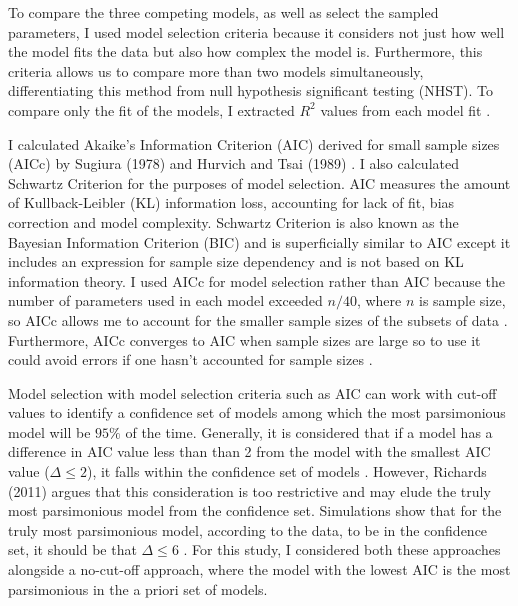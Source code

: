 \documentclass[11pt]{article}
\begin{document}
    To compare the three competing models, as well as select the sampled parameters, I used model selection criteria because it considers not just how well the model fits the data but also how complex the model is. Furthermore, this criteria allows us to compare more than two models simultaneously, differentiating this method from null hypothesis significant testing (NHST). To compare only the fit of the models, I extracted $R^2$ values from each model fit \cite{JohnsonOmland2004}.
    
    I calculated Akaike’s Information Criterion (AIC) derived for small sample sizes (AICc) by Sugiura (1978) and Hurvich and Tsai (1989) \cite{Burnham2011}. I also calculated Schwartz Criterion for the purposes of model selection. AIC measures the amount of Kullback-Leibler (KL) information loss, accounting for lack of fit, bias correction and model complexity. Schwartz Criterion is also known as the Bayesian Information Criterion (BIC) and is superficially similar to AIC except it includes an expression for sample size dependency and is not based on KL information theory. I used AICc for model selection rather than AIC because the number of parameters used in each model exceeded $n/40$, where $n$ is sample size, so AICc allows me to account for the smaller sample sizes of the subsets of data \cite{JohnsonOmland2004}. Furthermore, AICc converges to AIC when sample sizes are large so to use it could avoid errors if one hasn't accounted for sample sizes \cite{Burnham2011}.

    Model selection with model selection criteria such as AIC can work with cut-off values to identify a confidence set of models among which the most parsimonious model will be $95\%$ of the time. Generally, it is considered that if a model has a difference in AIC value less than than 2 from the model with the smallest AIC value ($\Delta\leq2$), it falls within the confidence set of models \cite{BurnhamKennethP2002}. However, Richards (2011) argues that this consideration is too restrictive and may elude the truly most parsimonious model from the confidence set. Simulations show that for the truly most parsimonious model, according to the data, to be in the confidence set, it should be that $\Delta\leq6$ \cite{Richards2011}. For this study, I considered both these approaches alongside a no-cut-off approach, where the model with the lowest AIC is the most parsimonious in the a priori set of models.
      
\end{document}
